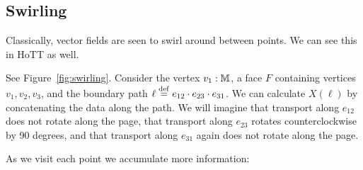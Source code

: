 \subsection{Swirling}
Classically, vector fields are seen to swirl around between points. We can see this in HoTT as well. 

See Figure~\ref{fig:swirling}. Consider the vertex \( v_1:\mathbb{M} \), a face \( F \) containing vertices \( v_1, v_2, v_3 \), and the boundary path \( \ell\stackrel{\mathrm{def}}{=} e_{12}\cdot e_{23} \cdot e_{31} \). We can calculate \( X(\ell) \) by concatenating the data along the path. We will imagine that transport along \( e_{12} \) does not rotate along the page, that transport along \( e_{23} \) rotates counterclockwise by 90 degrees, and that transport along \( e_{31} \) again does not rotate along the page.

As we visit each point we accumulate more information:

